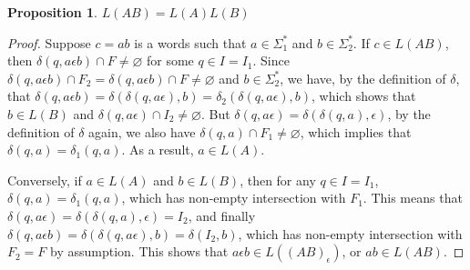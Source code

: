 \documentclass[12pt]{article}
\newtheorem{prop}{Proposition}
\begin{document}
\begin{prop} $L(AB)=L(A)L(B)$ \end{prop}
\begin{proof}  Suppose $c=ab$ is a words such that $a\in \Sigma_1^*$ and $b\in \Sigma_2^*$.  If $c\in L(AB)$, then $\delta(q,a\epsilon b)\cap F\neq \varnothing$ for some $q\in I=I_1$.  Since $\delta(q,a\epsilon b)\cap F_2  = \delta(q,a\epsilon b)\cap F\neq \varnothing$ and $b\in \Sigma_2^*$, we have, by the definition of $\delta$, that $\delta(q,a\epsilon b)=\delta(\delta(q,a\epsilon),b)=\delta_2(\delta(q,a\epsilon),b)$, which shows that $b\in L(B)$ and $\delta(q,a\epsilon)\cap I_2 \ne \varnothing$.  But $\delta(q,a\epsilon)=\delta(\delta(q,a),\epsilon)$, by the definition of $\delta$ again, we also have $\delta(q,a)\cap F_1\ne \varnothing$, which implies that $\delta(q,a)=\delta_1(q,a)$.  As a result, $a\in L(A)$.  

Conversely, if $a\in L(A)$ and $b\in L(B)$, then for any $q\in I=I_1$, $\delta(q,a)=\delta_1(q,a)$, which has non-empty intersection with $F_1$.  This means that $\delta(q,a\epsilon)= \delta(\delta(q,a),\epsilon)=I_2$, and finally $\delta(q,a\epsilon b)=\delta(\delta(q,a\epsilon),b)=\delta(I_2,b)$, which has non-empty intersection with $F_2=F$ by assumption.  This shows that $a\epsilon b\in L((AB)_{\epsilon})$, or $ab\in L(AB)$.
\end{proof}
\end{document}
